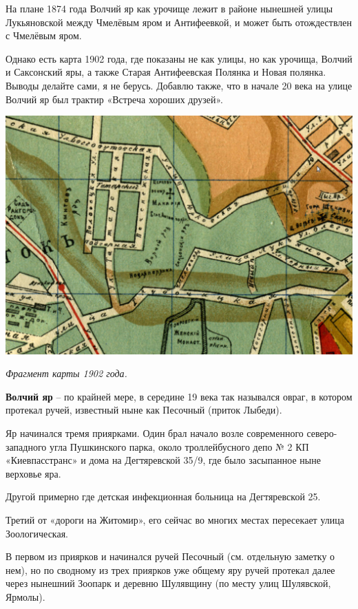 На плане 1874 года Волчий яр как урочище лежит в районе нынешней улицы Лукьяновской между Чмелёвым яром и Антифеевкой, и может быть отождествлен с Чмелёвым яром.

Однако есть карта 1902 года, где показаны не как улицы, но как урочища, Волчий и Саксонский яры, а также Старая Антифеевская Полянка и Новая полянка. Выводы делайте сами, я не берусь. Добавлю также, что в начале 20 века на улице Волчий яр был трактир «Встреча хороших друзей».

\begin{center}
\includegraphics[width=\linewidth]{rpix/volch01.jpg}

\textit{Фрагмент карты 1902 года.}
\end{center}



\medskip

\textbf{Волчий яр} – по крайней мере, в середине 19 века так назывался овраг, в котором протекал ручей, известный ныне как Песочный (приток Лыбеди).

Яр начинался тремя приярками. Один брал начало возле современного северо-западного угла Пушкинского парка, около троллейбусного депо № 2 КП «Киевпасстранс» и дома на Дегтяревской 35/9, где было засыпанное ныне верховье яра.

Другой примерно где детская инфекционная больница на Дегтяревской 25. 

Третий от «дороги на Житомир», его сейчас во многих местах пересекает улица Зоологическая. 

В первом из приярков и начинался ручей Песочный (см. отдельную заметку о нем), но по сводному из трех приярков уже общему яру ручей протекал далее через нынешний Зоопарк и деревню Шулявщину (по месту улиц Шулявской, Ярмолы).\\


